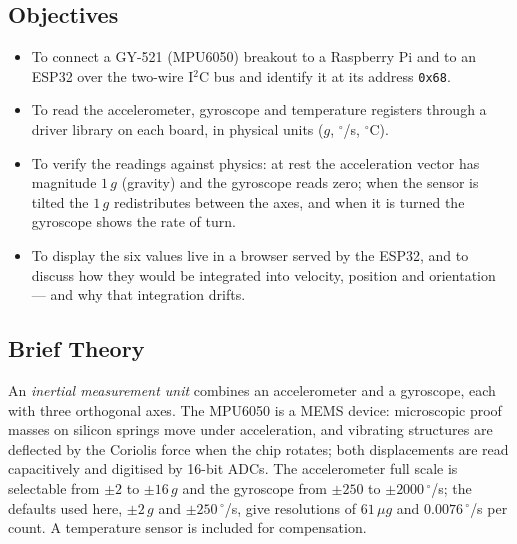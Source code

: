 \documentclass[10pt,a4paper]{article}
\begin{document}
\subsection*{Objectives}
\begin{itemize}
  \item To connect a GY-521 (MPU6050) breakout to a Raspberry Pi and to an ESP32 over
        the two-wire I$^2$C bus and identify it at its address \texttt{0x68}.
  \item To read the accelerometer, gyroscope and temperature registers through a driver
        library on each board, in physical units ($g$, $^{\circ}$/s, $^{\circ}$C).
  \item To verify the readings against physics: at rest the acceleration vector has
        magnitude $1\,g$ (gravity) and the gyroscope reads zero; when the sensor is
        tilted the $1\,g$ redistributes between the axes, and when it is turned the
        gyroscope shows the rate of turn.
  \item To display the six values live in a browser served by the ESP32, and to discuss
        how they would be integrated into velocity, position and orientation --- and why
        that integration drifts.
\end{itemize}

\subsection*{Brief Theory}
An \emph{inertial measurement unit} combines an accelerometer and a gyroscope, each
with three orthogonal axes. The MPU6050 is a MEMS device: microscopic proof masses on
silicon springs move under acceleration, and vibrating structures are deflected by the
Coriolis force when the chip rotates; both displacements are read capacitively and
digitised by 16-bit ADCs. The accelerometer full scale is selectable from $\pm2$ to
$\pm16\,g$ and the gyroscope from $\pm250$ to $\pm2000\,^{\circ}$/s; the defaults used
here, $\pm2\,g$ and $\pm250\,^{\circ}$/s, give resolutions of $61\,\mu g$ and
$0.0076\,^{\circ}$/s per count. A temperature sensor is included for compensation.
\end{document}
